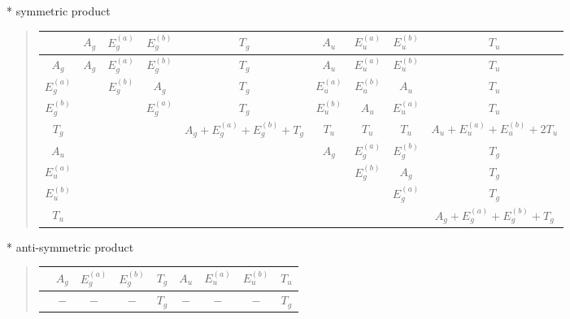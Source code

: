 \documentclass[fleqn,8pt,landscape]{jsarticle}
\begin{document}
* symmetric product
\begin{quote}
\begin{tabular}{c|cccccccc} \hline \hline
 & $ A_{g} $ & $ E_{g}^{(a)} $ & $ E_{g}^{(b)} $ & $ T_{g} $ & $ A_{u} $ & $ E_{u}^{(a)} $ & $ E_{u}^{(b)} $ & $ T_{u} $ \\ \hline
$ A_{g} $ & $ A_{g} $ & $ E_{g}^{(a)} $ & $ E_{g}^{(b)} $ & $ T_{g} $ & $ A_{u} $ & $ E_{u}^{(a)} $ & $ E_{u}^{(b)} $ & $ T_{u} $ \\
$ E_{g}^{(a)} $ & $  $ & $ E_{g}^{(b)} $ & $ A_{g} $ & $ T_{g} $ & $ E_{u}^{(a)} $ & $ E_{u}^{(b)} $ & $ A_{u} $ & $ T_{u} $ \\
$ E_{g}^{(b)} $ & $  $ & $  $ & $ E_{g}^{(a)} $ & $ T_{g} $ & $ E_{u}^{(b)} $ & $ A_{u} $ & $ E_{u}^{(a)} $ & $ T_{u} $ \\
$ T_{g} $ & $  $ & $  $ & $  $ & $ A_{g} + E_{g}^{(a)} + E_{g}^{(b)} + T_{g} $ & $ T_{u} $ & $ T_{u} $ & $ T_{u} $ & $ A_{u} + E_{u}^{(a)} + E_{u}^{(b)} + 2 T_{u} $ \\
$ A_{u} $ & $  $ & $  $ & $  $ & $  $ & $ A_{g} $ & $ E_{g}^{(a)} $ & $ E_{g}^{(b)} $ & $ T_{g} $ \\
$ E_{u}^{(a)} $ & $  $ & $  $ & $  $ & $  $ & $  $ & $ E_{g}^{(b)} $ & $ A_{g} $ & $ T_{g} $ \\
$ E_{u}^{(b)} $ & $  $ & $  $ & $  $ & $  $ & $  $ & $  $ & $ E_{g}^{(a)} $ & $ T_{g} $ \\
$ T_{u} $ & $  $ & $  $ & $  $ & $  $ & $  $ & $  $ & $  $ & $ A_{g} + E_{g}^{(a)} + E_{g}^{(b)} + T_{g} $ \\
 \hline \hline
\end{tabular}
\end{quote}

* anti-symmetric product
\begin{quote}
\begin{tabular}{ccccccccc} \hline \hline
 & $ A_{g} $ & $ E_{g}^{(a)} $ & $ E_{g}^{(b)} $ & $ T_{g} $ & $ A_{u} $ & $ E_{u}^{(a)} $ & $ E_{u}^{(b)} $ & $ T_{u} $ \\ \hline
$  $ & $ - $ & $ - $ & $ - $ & $ T_{g} $ & $ - $ & $ - $ & $ - $ & $ T_{g} $ \\
 \hline \hline
\end{tabular}
\end{quote}
\end{document}
